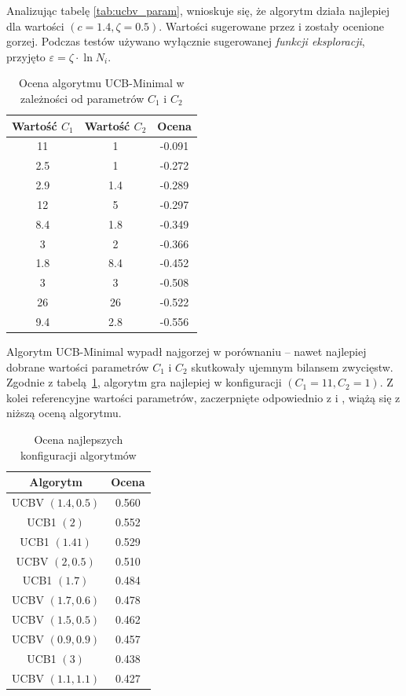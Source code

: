 \documentclass[a4paper,12pt]{article}
\begin{document}
Analizując tabelę \ref{tab:ucbv_param}, wnioskuje się, że algorytm działa najlepiej dla wartości $(c=1.4, \zeta=0.5)$. Wartości sugerowane przez \cite{tron} i \cite{ucbv} zostały ocenione gorzej. Podczas testów używano wyłącznie sugerowanej \textit{funkcji eksploracji}, przyjęto $\varepsilon=\zeta \cdot \ln N_i$.\\

\begin{table}[!h]
	\centering
	\begin{tabular}{|c|c|c|} \hline
		Wartość $C_1$ & Wartość $C_2$ & Ocena \\ \hline
		11 & 1 & 	-0.091 \\ \hline
		\rowcolor{teal} 2.5 & 1 & 	-0.272 \\ \hline
		2.9 & 1.4 & 	-0.289 \\ \hline
		12 & 5 & 	-0.297 \\ \hline
		\rowcolor{yellow} 8.4 & 1.8 & 	-0.349 \\ \hline
		3 & 2 & 	-0.366 \\ \hline
		1.8 & 8.4 & 	-0.452 \\ \hline
		3 & 3 & 	-0.508 \\ \hline
		26 & 26 & 	-0.522 \\ \hline
		9.4 & 2.8 & 	-0.556 \\ \hline
	\end{tabular}
	\caption{Ocena algorytmu UCB-Minimal w zależności od parametrów $C_1$ i $C_2$}
	\label{tab:ucbm_param}
\end{table}

Algorytm UCB-Minimal wypadł najgorzej w porównaniu -- nawet najlepiej dobrane wartości parametrów $C_1$ i $C_2$ skutkowały ujemnym bilansem zwycięstw. Zgodnie z tabelą~\ref{tab:ucbm_param}, algorytm gra najlepiej w konfiguracji $(C_1 = 11, C_2 = 1)$. Z kolei referencyjne wartości parametrów, zaczerpnięte odpowiednio z \cite{ucbminimal} i \cite{tron}, wiążą się z niższą oceną algorytmu.

\clearpage

\begin{table}[!h]
	\centering
	\begin{tabular}{|c|c|} \hline
		Algorytm & Ocena \\ \hline
		UCBV $(1.4, 0.5)$ &	0.560 \\ \hline
		UCB1 $(2)$ &	0.552 \\ \hline
		UCB1 $(1.41)$ &	0.529 \\ \hline
		UCBV $(2, 0.5)$ &	0.510 \\ \hline
		UCB1 $(1.7)$ &	0.484 \\ \hline
		UCBV $(1.7, 0.6)$ &	0.478 \\ \hline
		UCBV $(1.5, 0.5)$ &	0.462 \\ \hline
		UCBV $(0.9, 0.9)$ &	0.457 \\ \hline
		UCB1 $(3)$ &	0.438 \\ \hline
		UCBV $(1.1, 1.1)$ &	0.427 \\ \hline
	\end{tabular}
	\caption{Ocena najlepszych konfiguracji algorytmów}
	\label{tab:all_params}
\end{table}
\end{document}

